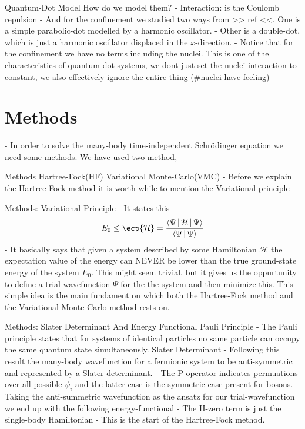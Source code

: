 \documentclass[10pt]{beamer}
\begin{document}
\begin{frame}[fragile]{Quantum-Dot Model}
    How do we model them?
        - Interaction: is the Coulomb repulsion
        - And for the confinement we studied two ways from >> ref <<. One is a simple parabolic-dot modelled by a harmonic oscillator.
        - Other is a double-dot, which is just a harmonic oscillator displaced in the $x$-direction.
        - Notice that for the confinement we have no terms including the nuclei. This is one of the characteristics of quantum-dot systems, we dont just set the nuclei interaction to constant, we also effectively ignore the entire thing (#nuclei have feeling)
\end{frame}

\section{Methods}
- In order to solve the many-body time-independent Schrödinger equation we need
some methods. We have used two method,
\begin{frame}[fragile]{Methods}
    Hartree-Fock(HF)
    Variational Monte-Carlo(VMC)
    - Before we explain the Hartree-Fock method it is worth-while to mention the Variational principle
\end{frame}

\begin{frame}[fragile]{Methods: Variational Principle}
    - It states this
    \begin{equation*}
        E_0 \leq \ecp{\mathcal{H}} =
        \frac{\Braket{\Psi|\mathcal{H}|\Psi}}{\Braket{\Psi|\Psi}}
        \label{eq:varPrinc}
    \end{equation*}
    - It basically says that given a system described by some Hamiltonian $\mathcal{H}$ the expectation value of the energy can NEVER be lower than the true ground-state energy of the system $E_0$. This might seem trivial, but it gives us the oppurtunity to define a trial wavefunction $\Psi$ for the the system and then minimize this. This simple idea is the main fundament on which both the Hartree-Fock method and the Variational Monte-Carlo method rests on.
\end{frame}

\begin{frame}[standout]{Methods: Slater Determinant And Energy Functional}
    Pauli Principle
        - The Pauli principle states that for systems of identical particles no same particle can occupy the same quantum state simultaneously.
    Slater Determinant
        - Following this result the many-body wavefunction for a fermionic
        system to be anti-symmetric and represented by a Slater determinant.
        - The P-operator indicates permuations over all possible $\psi_i$ and
        the latter case is the symmetric case present for bosons.
        - Taking the anti-summetric wavefunction as the ansatz for our
        trial-wavefunction we end up with the following energy-functional
        - The H-zero term is just the single-body Hamiltonian
        - This is the start of the Hartree-Fock method.
\end{frame}
\end{document}
